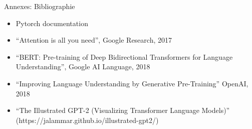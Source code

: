 \documentclass[12pt]{beamer}
\begin{document}

\begin{frame}{Annexes: Bibliographie}
\footnotesize
\begin{itemize}
	\item Pytorch documentation
	\item ``Attention is all you need'', Google Research, 2017
	\item ``BERT: Pre-training of Deep Bidirectional Transformers for Language Understanding'', Google AI Language, 2018
	\item ``Improving Language Understanding by Generative Pre-Training'' OpenAI, 2018
	\item ``The Illustrated GPT-2 (Visualizing Transformer Language Models)'' (https://jalammar.github.io/illustrated-gpt2/)
\end{itemize}

\end{frame}
\end{document}
